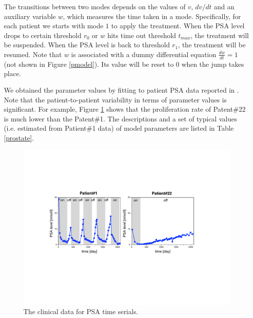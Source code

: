 The transitions between two modes depends on the values of $v$, ${dv}/{dt}$ and an auxiliary variable $w$, which measures the time taken in a mode. Specifically, for each patient we starts with mode $1$ to apply the treatment. When the PSA level drops to certain threshold $r_0$ or $w$ hits time out threshold $t_{max}$, the treatment will be suspended. When the PSA level is back to threshold $r_1$, the treatment will be resumed. Note that $w$ is associated with a dummy differential equation $\frac{dw}{dt}=1$ (not shown in Figure \ref{pmodel}). Its value will be reset to $0$ when the jump takes place.  

We obtained the parameter values by fitting to patient PSA data reported in \cite{bruchovsky06, bruchovsky07}. Note that the patient-to-patient variability in terms of parameter values is significant. For example, Figure \ref{data} shows that the proliferation rate of Patent\#22 is much lower than the Patent\#1. The descriptions and a set of typical values (i.e. estimated from Patient\#1 data) of model parameters are listed in Table \ref{prostate}.

\begin{figure}[htb]
\centering
\includegraphics[scale=0.47]{fig-data}
\caption{The clinical data for PSA time serials.}
\label{data}
 \vspace{-0.3cm}
\end{figure}




